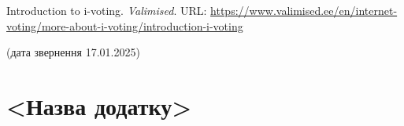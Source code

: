 \documentclass[14pt]{extreport}
\begin{document}
  \renewcommand\bibname{\MakeUppercase{Список літератури}}
  \begin{thebibliography}{99}
     Introduction to i-voting. \textit{Valimised}. 
    URL: \url{https://www.valimised.ee/en/internet-voting/more-about-i-voting/introduction-i-voting} 
    
    (дата звернення 17.01.2025)
  \end{thebibliography}
  
  \appendix
  \renewcommand{\thechapter}{\Alph{chapter}}
  \renewcommand{\chaptername}{Додаток}
  
  \chapter{<Назва додатку>}
  
\end{document}
